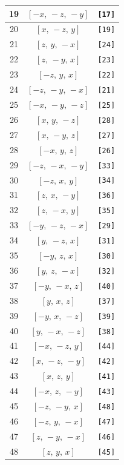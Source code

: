 \documentclass[fleqn,8pt]{jsarticle}
\begin{document}
\begin{longtable}{ccc}
19 & $\left[ - x,\, - z,\, - y \right]$ & {\tt [17]} \\ \hline
20 & $\left[ x,\, - z,\, y \right]$ & {\tt [19]} \\ \hline
21 & $\left[ z,\, y,\, - x \right]$ & {\tt [24]} \\ \hline
22 & $\left[ z,\, - y,\, x \right]$ & {\tt [23]} \\ \hline
23 & $\left[ - z,\, y,\, x \right]$ & {\tt [22]} \\ \hline
24 & $\left[ - z,\, - y,\, - x \right]$ & {\tt [21]} \\ \hline
25 & $\left[ - x,\, - y,\, - z \right]$ & {\tt [25]} \\ \hline
26 & $\left[ x,\, y,\, - z \right]$ & {\tt [28]} \\ \hline
27 & $\left[ x,\, - y,\, z \right]$ & {\tt [27]} \\ \hline
28 & $\left[ - x,\, y,\, z \right]$ & {\tt [26]} \\ \hline
29 & $\left[ - z,\, - x,\, - y \right]$ & {\tt [33]} \\ \hline
30 & $\left[ - z,\, x,\, y \right]$ & {\tt [34]} \\ \hline
31 & $\left[ z,\, x,\, - y \right]$ & {\tt [36]} \\ \hline
32 & $\left[ z,\, - x,\, y \right]$ & {\tt [35]} \\ \hline
33 & $\left[ - y,\, - z,\, - x \right]$ & {\tt [29]} \\ \hline
34 & $\left[ y,\, - z,\, x \right]$ & {\tt [31]} \\ \hline
35 & $\left[ - y,\, z,\, x \right]$ & {\tt [30]} \\ \hline
36 & $\left[ y,\, z,\, - x \right]$ & {\tt [32]} \\ \hline
37 & $\left[ - y,\, - x,\, z \right]$ & {\tt [40]} \\ \hline
38 & $\left[ y,\, x,\, z \right]$ & {\tt [37]} \\ \hline
39 & $\left[ - y,\, x,\, - z \right]$ & {\tt [39]} \\ \hline
40 & $\left[ y,\, - x,\, - z \right]$ & {\tt [38]} \\ \hline
41 & $\left[ - x,\, - z,\, y \right]$ & {\tt [44]} \\ \hline
42 & $\left[ x,\, - z,\, - y \right]$ & {\tt [42]} \\ \hline
43 & $\left[ x,\, z,\, y \right]$ & {\tt [41]} \\ \hline
44 & $\left[ - x,\, z,\, - y \right]$ & {\tt [43]} \\ \hline
45 & $\left[ - z,\, - y,\, x \right]$ & {\tt [48]} \\ \hline
46 & $\left[ - z,\, y,\, - x \right]$ & {\tt [47]} \\ \hline
47 & $\left[ z,\, - y,\, - x \right]$ & {\tt [46]} \\ \hline
48 & $\left[ z,\, y,\, x \right]$ & {\tt [45]} \\
\end{longtable}
\end{document}

